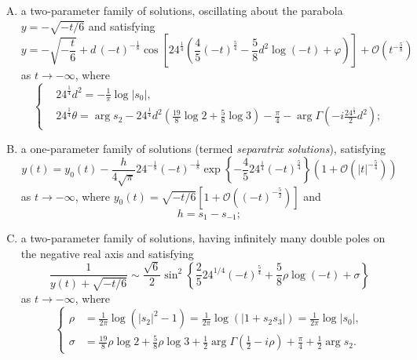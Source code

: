 \documentclass[12pt]{article}
\theoremstyle{plain}
\theoremstyle{definition}
\numberwithin{equation}{section}
\begin{document}
\begin{enumerate}[(A)]
\item a two-parameter family of solutions, oscillating about the parabola $y=-\sqrt{-t/6}$ and satisfying
\begin{equation}\label{eq-behavior-type-A}
y=-\sqrt{-\frac{t}{6}}+d\,(-t)^{-\frac{1}{8}}\cos{\left[24^{\frac{1}{4}}\left(\frac{4}{5}(-t)^{\frac{5}{4}}-\frac{5}{8}d^2 \log(-t)+\varphi\right)\right]}+\mathcal{O}\left (t^{-\frac{5}{8}}\right )
\end{equation}
as $t\rightarrow-\infty$, where
    \begin{equation}\label{eq-parameter-d-theta}
  \left\{\begin{aligned}
  &24^{\frac{1}{4}}d^{2}=-\frac{1}{\pi}\log{|s_{0}|},\\
  &24^{\frac{1}{4}}\theta=\arg{s_{2}}-24^{\frac{1}{4}}d^{2}\left(\frac{19}{8}\log{2}+\frac{5}{8}\log{3}\right)-\frac{\pi}{4}-\arg\Gamma\left(-i\frac{24^{\frac{1}{4}}}{2}d^{2}\right);
\end{aligned}\right.
\end{equation}
\item a one-parameter family of solutions (termed {\it separatrix solutions}), satisfying
    \begin{equation}\label{eq-behavior-type-B}
      y(t)=y_{0}(t)-\frac{h}{4\sqrt{\pi}}24^{-\frac{1}{8}}(-t)^{-\frac{1}{8}}\exp\left\{-\frac{4}{5}24^{\frac{1}{4}}(-t)^{\frac{5}{4}}\right\}\left(1+\mathcal{O}\left(|t|^{-\frac{5}{4}}\right)\right)
    \end{equation}
    as $t\rightarrow-\infty$, where $y_{0}(t)=\sqrt{-t/6}\left[1+\mathcal{O}\left((-t)^{-\frac{5}{2}}\right)\right]$ and
    \begin{equation}\label{eq-h-s1-s-1}
    h=s_{1}-s_{-1};
    \end{equation}
\item a two-parameter family of solutions, having infinitely many double poles on the negative real axis and satisfying
    \begin{equation}\label{eq-behavior-type-C}
      \frac{1}{y(t)+\sqrt{{-t}/{6}}}\sim \frac{\sqrt{6}}{2}\sin^{2}\left\{\frac{2}{5}24^{1/4}(-t)^{\frac{5}{4}}+\frac{5}{8}\rho\log(-t)+\sigma\right\}
    \end{equation}
    as $t\rightarrow-\infty$, where
    \begin{equation}\label{eq-parameter-rho-sigma}
    \left\{\begin{aligned}
    \rho&=\frac{1}{2\pi}\log(|s_{2}|^{2}-1)=\frac{1}{2\pi}\log(|1+s_{2}s_{3}|)=\frac{1}{2\pi}\log|s_{0}|,\\
    \sigma&=\frac{19}{8}\rho\log{2}+\frac{5}{8}\rho\log{3}+\frac{1}{2}\arg\Gamma\left(\frac{1}{2}-i\rho\right)+\frac{\pi}{4}+\frac{1}{2}\arg{s_{2}}.
    \end{aligned}\right.
    \end{equation}
\end{enumerate}
\end{document}
